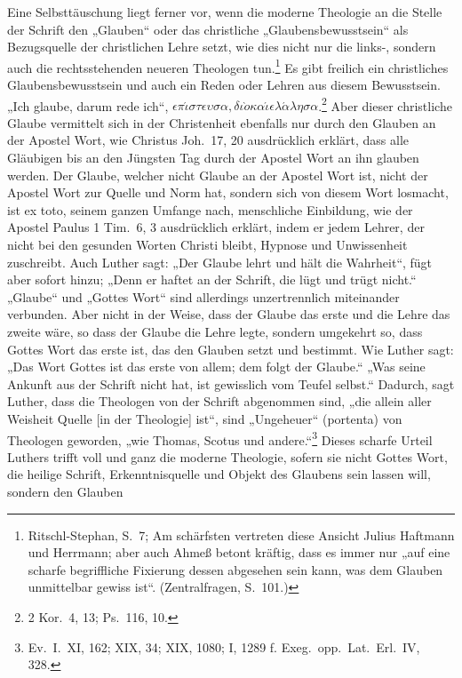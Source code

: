Eine Selbsttäuschung liegt ferner vor, wenn die moderne Theologie an die Stelle der Schrift den „Glauben“ oder das christliche „Glaubensbewusstsein“ als Bezugsquelle der christlichen Lehre setzt, wie dies nicht nur die links-, sondern auch die rechtsstehenden neueren Theologen tun.\footnote{Ritschl-Stephan, S.~7; Am schärfsten vertreten diese Ansicht Julius Haftmann und Herrmann; aber auch Ahmeß betont kräftig, dass es immer nur „auf eine scharfe begriffliche Fixierung dessen abgesehen sein kann, was dem Glauben unmittelbar gewiss ist“. (Zentralfragen, S.~101.)} Es gibt freilich ein christliches Glaubensbewusstsein und auch ein Reden oder Lehren aus diesem Bewusstsein. „Ich glaube, darum rede ich“, $\epsilon\pi\acute{\iota}\sigma\tau\epsilon\upsilon\sigma\alpha, \delta\iota\grave{o} \kappa\alpha\acute{\iota} \epsilon\lambda\acute{\alpha}\lambda\eta\sigma\alpha$.\footnote{2 Kor.~4, 13; Ps.~116, 10.} Aber dieser christliche Glaube vermittelt sich in der Christenheit ebenfalls nur durch den Glauben an der Apostel Wort, wie Christus Joh.~17, 20 ausdrücklich erklärt, dass alle Gläubigen bis an den Jüngsten Tag durch der Apostel Wort an ihn glauben werden. Der Glaube, welcher nicht Glaube an der Apostel Wort ist, nicht der Apostel Wort zur Quelle und Norm hat, sondern sich von diesem Wort losmacht, ist ex toto, seinem ganzen Umfange nach, menschliche Einbildung, wie der Apostel Paulus 1 Tim.~6, 3 ausdrücklich erklärt, indem er jedem Lehrer, der nicht bei den gesunden Worten Christi bleibt, Hypnose und Unwissenheit zuschreibt. Auch Luther sagt: „Der Glaube lehrt und hält die Wahrheit“, fügt aber sofort hinzu; „Denn er haftet an der Schrift, die lügt und trügt nicht.“ „Glaube“ und „Gottes Wort“ sind allerdings unzertrennlich miteinander verbunden. Aber nicht in der Weise, dass der Glaube das erste und die Lehre das zweite wäre, so dass der Glaube die Lehre legte, sondern umgekehrt so, dass Gottes Wort das erste ist, das den Glauben setzt und bestimmt. Wie Luther sagt: „Das Wort Gottes ist das erste von allem; dem folgt der Glaube.“ „Was seine Ankunft aus der Schrift nicht hat, ist gewisslich vom Teufel selbst.“ Dadurch, sagt Luther, dass die Theologen von der Schrift abgenommen sind, „die allein aller Weisheit Quelle [in der Theologie] ist“, sind „Ungeheuer“ (portenta) von Theologen geworden, „wie Thomas, Scotus und andere.“\footnote{Ev.~I.~XI, 162; XIX, 34; XIX, 1080; I, 1289 f. Exeg.~opp.~Lat.~Erl.~IV, 328.} Dieses scharfe Urteil Luthers trifft voll und ganz die moderne Theologie, sofern sie nicht Gottes Wort, die heilige Schrift, Erkenntnisquelle und Objekt des Glaubens sein lassen will, sondern den Glauben
